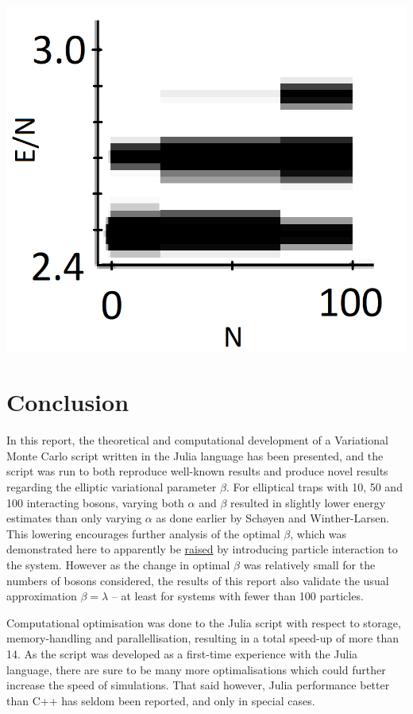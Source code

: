 \documentclass[a4paper,8pt]{article}
\begin{document}
\begin{multicols}{2}
\begin{center}
\includegraphics[width=0.9\columnwidth]{DBG_results}
\label{DBGresults}
\end{center}



\section{Conclusion}
In this report, the theoretical and computational development of a Variational Monte Carlo script written in the Julia language has been presented, and the script was run to both reproduce well-known results and produce novel results regarding the elliptic variational parameter $\beta$. For elliptical traps with 10, 50 and 100 interacting bosons, varying both $\alpha$ and $\beta$ resulted in slightly lower energy estimates than only varying $\alpha$ as done earlier by Schøyen and Winther-Larsen\cite{SWL}. This lowering encourages further analysis of the optimal $\beta$, which was demonstrated here to apparently be \underline{raised} by introducing particle interaction to the system. However as the change in optimal $\beta$ was relatively small for the numbers of bosons considered, the results of this report also validate the usual approximation ${\beta = \lambda}$ -- at least for systems with fewer than 100 particles.

Computational optimisation was done to the Julia script with respect to storage, memory-handling and parallellisation, resulting in a total speed-up of more than 14. As the script was developed as a first-time experience with the Julia language, there are sure to be many more optimalisations which could further increase the speed of simulations. That said however, Julia performance better than C++ has seldom been reported, and only in special cases.


\end{multicols}
\end{document}
